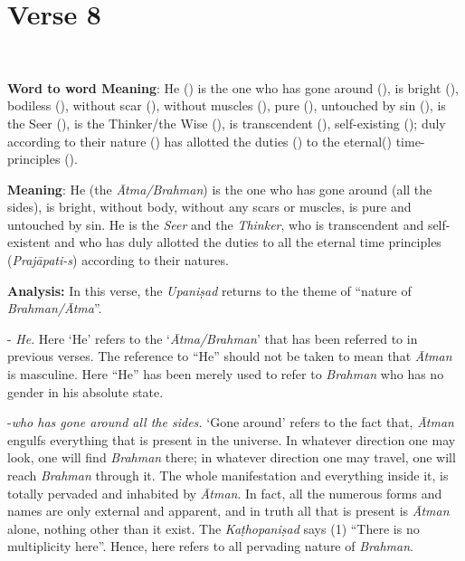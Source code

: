 \chapter{Verse 8}

\begin{moolashloka}
\\
\end{moolashloka}

\textbf{Word to word Meaning}: He () is the one who has gone around (), is bright (), bodiless (), without scar (), without muscles (), pure (), untouched by sin (), is the Seer (), is the Thinker/the Wise (), is transcendent (), self-existing (); duly according to their nature () has allotted the duties () to the eternal() time-principles ().

\textbf{Meaning}: He (the \emph{Ātma/Brahman}) is the one who has gone around (all the sides), is bright, without body, without any scars or muscles, is pure and untouched by sin. He is the \emph{Seer} and the \emph{Thinker}, who is transcendent and self-existent and who has duly allotted the duties to all the eternal time principles (\emph{Prajāpati-s}) according to their natures.

\textbf{Analysis:} In this verse, the \emph{Upaniṣad} returns to the theme of ``nature of \emph{Brahman/Ātma}''.

- \emph{He}. Here `He' refers to the `\emph{Ātma/Brahman}' that has been referred to in previous verses. The reference to ``He'' should not be taken to mean that \emph{Ātman} is masculine. Here ``He'' has been merely used to refer to \emph{Brahman} who has no gender in his absolute state.

-\emph{who has gone around all the sides.} `Gone around' refers to the fact that, \emph{Ātman} engulfs everything that is present in the universe. In whatever direction one may look, one will find \emph{Brahman} there; in whatever direction one may travel, one will reach \emph{Brahman} through it. The whole manifestation and everything inside it, is totally pervaded and inhabited by \emph{Ātman}. In fact, all the numerous forms and names are only external and apparent, and in truth all that is present is \emph{Ātman} alone, nothing other than it exist. The \emph{Kaṭhopaniṣad} says (1) ``There is no multiplicity here''. Hence, here  refers to all pervading nature of \emph{Brahman}.
\newpage

